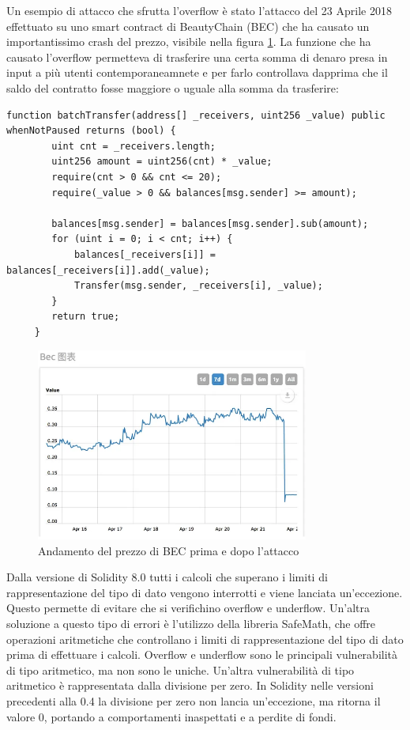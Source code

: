 \documentclass[../../Thesis.tex]{subfiles}
\begin{document}
Un esempio di attacco che sfrutta l'overflow \`e stato l'attacco del 23 Aprile 2018 effettuato su uno smart contract di BeautyChain (BEC) che ha causato un importantissimo crash del prezzo, visibile nella figura \ref{fig:BECPrice}. La funzione che ha causato l'overflow permetteva di trasferire una certa somma di denaro presa in input a pi\`u utenti contemporaneamnete e per farlo controllava dapprima che il saldo del contratto fosse maggiore o uguale alla somma da trasferire:
\begin{lstlisting}[language=Solidity]
    function batchTransfer(address[] _receivers, uint256 _value) public whenNotPaused returns (bool) {
        uint cnt = _receivers.length;
        uint256 amount = uint256(cnt) * _value;
        require(cnt > 0 && cnt <= 20);
        require(_value > 0 && balances[msg.sender] >= amount);
    
        balances[msg.sender] = balances[msg.sender].sub(amount);
        for (uint i = 0; i < cnt; i++) {
            balances[_receivers[i]] = balances[_receivers[i]].add(_value);
            Transfer(msg.sender, _receivers[i], _value);
        }
        return true;
     }
\end{lstlisting}

\begin{figure}[h]
    \centering
    \includegraphics[width=0.8\textwidth]{../../img/BECPrice.png}
    \caption{Andamento del prezzo di BEC prima e dopo  l'attacco}
    \label{fig:BECPrice}
\end{figure}
Dalla versione di Solidity 8.0  tutti i calcoli che superano i limiti di rappresentazione del tipo di dato vengono interrotti e viene lanciata un'eccezione. Questo permette di evitare che si verifichino overflow e underflow. Un'altra soluzione a questo tipo di errori \`e l'utilizzo della libreria SafeMath, che offre operazioni aritmetiche che controllano i limiti di rappresentazione del tipo di dato prima di effettuare i calcoli. Overflow e underflow sono le principali vulnerabilit\`a di tipo aritmetico, ma non sono le uniche. Un'altra vulnerabilit\`a di tipo aritmetico \`e rappresentata dalla divisione per zero. In Solidity nelle versioni precedenti alla 0.4 la divisione per zero non lancia un'eccezione, ma ritorna il valore 0, portando a comportamenti inaspettati e a perdite di fondi.
\\
\\
\\
\end{document}
